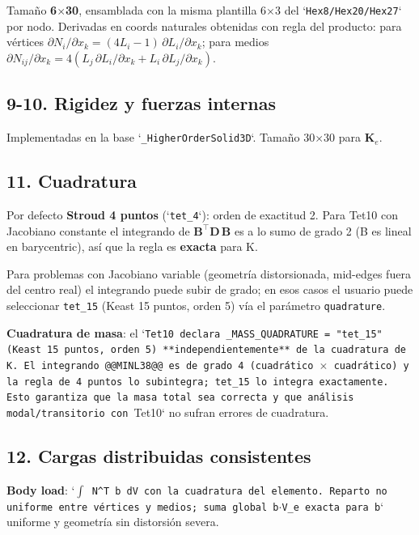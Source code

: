 \documentclass[11pt,letterpaper,oneside]{report}
\begin{document}
Tamaño \textbf{6\ensuremath{\times}30}, ensamblada con la misma plantilla 6\ensuremath{\times}3 del `\texttt{Hex8}\texttt{/}\texttt{Hex20}\texttt{/}\texttt{Hex27}` por nodo. Derivadas en coords naturales obtenidas con regla del producto: para vértices $\partial N_i / \partial x_k = (4 L_i - 1)\,\partial L_i / \partial x_k$; para medios $\partial N_{ij}/\partial x_k = 4(L_j\,\partial L_i/\partial x_k + L_i\,\partial L_j/\partial x_k)$.

\subsection{9-10. Rigidez y fuerzas internas}

Implementadas en la base `\texttt{\_HigherOrderSolid3D}`. Tamaño 30\ensuremath{\times}30 para $\mathbf K_e$.

\subsection{11. Cuadratura}

Por defecto \textbf{Stroud 4 puntos} (`\texttt{tet\_4}`): orden de exactitud 2. Para Tet10 con Jacobiano constante el integrando de $\mathbf B^\top \mathbf D\, \mathbf B$ es a lo sumo de grado 2 (B es lineal en barycentric), así que la regla es \textbf{exacta} para K.

Para problemas con Jacobiano variable (geometría distorsionada, mid-edges fuera del centro real) el integrando puede subir de grado; en esos casos el usuario puede seleccionar \texttt{tet\_15} (Keast 15 puntos, orden 5) vía el parámetro \texttt{quadrature}.

\textbf{Cuadratura de masa}: el `\texttt{Tet10}\texttt{ declara }\texttt{\_MASS\_QUADRATURE = "tet\_15"}\texttt{ (Keast 15 puntos, orden 5) **independientemente** de la cuadratura de K. El integrando @@MINL38@@ es de grado 4 (cuadrático \ensuremath{\times} cuadrático) y la regla de 4 puntos lo subintegra; }\texttt{tet\_15}\texttt{ lo integra exactamente. Esto garantiza que la masa total sea correcta y que análisis modal/transitorio con }Tet10` no sufran errores de cuadratura.

\subsection{12. Cargas distribuidas consistentes}

\textbf{Body load}: `\texttt{\ensuremath{\int} N\textasciicircum{}T b dV}\texttt{ con la cuadratura del elemento. Reparto no uniforme entre vértices y medios; suma global }\texttt{b\ensuremath{\cdot}V\_e}\texttt{ exacta para }\texttt{b}` uniforme y geometría sin distorsión severa.
\end{document}
